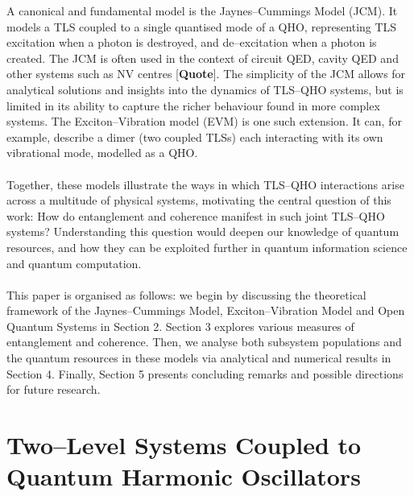 \documentclass[12pt]{article}
\begin{document}
A canonical and fundamental model is the Jaynes--Cummings Model (JCM). It models a TLS coupled to a single quantised mode of a QHO, representing TLS excitation when a photon is destroyed, and de--excitation when a photon is created. The JCM is often used in the context of circuit QED, cavity QED and other systems such as NV centres [\textbf{Quote}]. The simplicity of the JCM allows for analytical solutions and insights into the dynamics of TLS--QHO systems, but is limited in its ability to capture the richer behaviour found in more complex systems. The Exciton–Vibration model (EVM) is one such extension. It can, for example, describe a dimer (two coupled TLSs) each interacting with its own vibrational mode, modelled as a QHO.\\
\\
Together, these models illustrate the ways in which TLS–QHO interactions arise across a multitude of physical systems, motivating the central question of this work: How do entanglement and coherence manifest in such joint TLS--QHO systems? Understanding this question would deepen our knowledge of quantum resources, and how they can be exploited further in quantum information science and quantum computation. \\
\\
This paper is organised as follows: we begin by discussing the theoretical framework of the Jaynes--Cummings Model, Exciton--Vibration Model and Open Quantum Systems in Section 2. Section 3 explores various measures of entanglement and coherence. Then, we analyse both subsystem populations and the quantum resources in these models via analytical and numerical results in Section 4. Finally, Section 5 presents concluding remarks and possible directions for future research.




























\newpage
\section{Two--Level Systems Coupled to Quantum Harmonic Oscillators}
\end{document}
